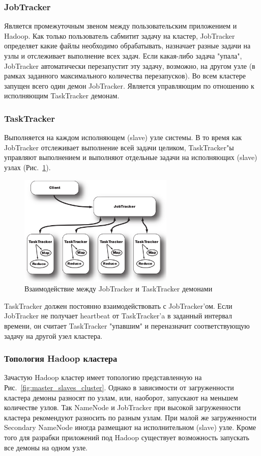 \documentclass[a4paper,11pt]{article}
\begin{document}
\subsubsection{JobTracker}
Является промежуточным звеном между пользовательским приложением и Hadoop. Как только пользователь сабмитит задачу
на кластер, JobTracker определяет какие файлы необходимо обрабатывать, назначает разные задачи на узлы и отслеживает
выполнение всех задач. Если какая-либо задача "упала", JobTracker автоматически перезапустит эту задачу, возможно, на
другом узле (в рамках заданного максимального количества перезапусков). Во всем кластере запущен всего один демон
JobTracker. Является управляющим по отношению к исполняющим TaskTracker демонам.

\subsubsection{TaskTracker}
Выполняется на каждом исполняющем (slave) узле системы. В то время как JobTracker отслеживает выполнение всей задачи
целиком, TaskTracker"ы управляют выполнением и выполняют отдельные задачи на исполняющих (slave) узлах
(Рис.~\ref{fig:jobtracker_tasktracker}).

\begin{figure}[h!]
  \centering
  \includegraphics[height=200px]{res/jobtracker_tasktracker.png}
  \caption{Взаимодействие между JobTracker и TaskTracker демонами}
  \label{fig:jobtracker_tasktracker}
\end{figure}

TaskTracker должен постоянно взаимодействовать с JobTracker'ом. Если JobTracker не получает heartbeat от TaskTracker'a
в заданный интервал времени, он считает TaskTracker "упавшим" и переназначит соответствующую задачу на другой узел
кластера.

\subsubsection{Топология Hadoop кластера}
Зачастую Hadoop кластер имеет топологию представленную на Рис.~\ref{fig:master_slaves_cluster}. Однако в зависимости
от загруженности кластера демоны разносят по узлам, или, наоборот, запускают на меньшем количестве узлов. Так NameNode
и JobTracker при высокой загруженности кластера рекомендуют разносить по разным узлам. При малой же загруженности 
Secondary NameNode иногда размещают на исполнительном (slave) узле. Кроме того для разрабки приложений под Hadoop
существует возможность запускать все демоны на одном узле.
\end{document}
